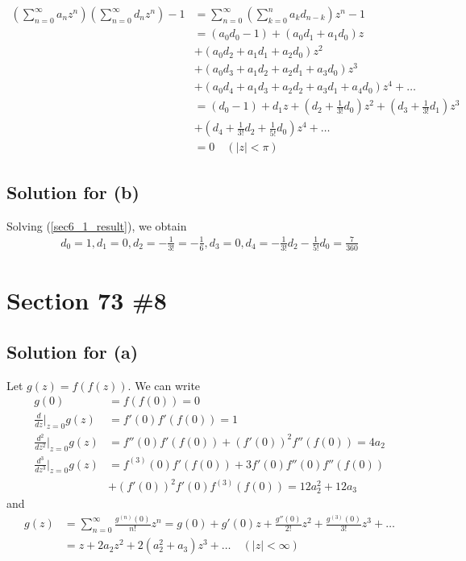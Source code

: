 \documentclass{scrartcl}
\begin{document}
\begin{align}
  \nonumber             \left( \sum^\infty_{n = 0} a_n z^n \right) \left( \sum^\infty_{n = 0} d_n z^n \right) - 1
  \nonumber             &= \sum^\infty_{n = 0} \left( \sum^n_{k = 0} a_k d_{n - k} \right) z^n - 1 \\
  \nonumber             &= (a_0 d_0 - 1) + (a_0 d_1 + a_1 d_0) z \\
  \nonumber             &+ (a_0 d_2 + a_1 d_1 + a_2 d_0) z^2 \\
  \nonumber             &+ (a_0 d_3 + a_1 d_2 + a_2 d_1 + a_3 d_0) z^3 \\
  \nonumber             &+ (a_0 d_4 + a_1 d_3 + a_2 d_2 + a_3 d_1 + a_4 d_0) z^4 + \dots \\
  \nonumber             &= (d_0 - 1) + d_1 z + \left( d_2 + \frac{1}{3!}d_0 \right) z^2 + \left( d_3 + \frac{1}{3!}d_1 \right) z^3 \\
  \label{sec6_1_result} &+ \left( d_4 + \frac{1}{3!}d_2 + \frac{1}{5!}d_0 \right) z^4 + \dots \\
  \nonumber             &= 0 \quad (|z| < \pi)
\end{align}

\subsection{Solution for (b)}
Solving (\ref{sec6_1_result}), we obtain
\begin{align*}
  d_0 = 1, d_1 = 0, d_2 = -\frac{1}{3!} = -\frac{1}{6}, d_3 = 0, d_4 = -\frac{1}{3!}d_2 - \frac{1}{5!}d_0 = \frac{7}{360}
\end{align*}

\section{Section 73 \#8}
\subsection{Solution for (a)}
Let \(g(z) = f(f(z))\).
We can write
\begin{align*}
  g(0) &= f(f(0)) = 0 \\
  \frac{d}{dz}\Bigr|_{z = 0} g(z) &= f'(0) f'(f(0)) = 1 \\
  \frac{d^2}{dz^2}\Bigr|_{z = 0} g(z) &= f''(0) f'(f(0)) + (f'(0))^2 f''(f(0)) = 4a_2 \\
  \frac{d^3}{dz^3}\Bigr|_{z = 0} g(z) &= f^{(3)}(0) f'(f(0)) + 3f'(0) f''(0) f''(f(0)) \\
                                      &+ (f'(0))^2 f'(0) f^{(3)}(f(0)) = 12a_2^2 + 12a_3
\end{align*}
and
\begin{align}
  \nonumber g(z)
  \nonumber &= \sum^\infty_{n = 0} \frac{g^{(n)}(0)}{n!} z^n
  \nonumber = g(0) + g'(0) z + \frac{g''(0)}{2!} z^2 + \frac{g^{(3)}(0)}{3!} z^3 + \dots \\
  \label{sec7_1_result} &= z + 2a_2 z^2 + 2(a_2^2 + a_3) z^3 + \dots \quad (|z| < \infty)
\end{align}
\end{document}
